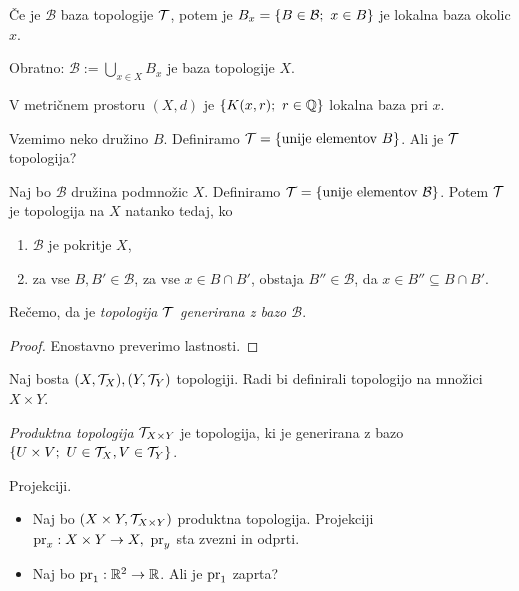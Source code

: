 \begin{trditev}
    Če je $\mathcal{B}$ baza topologije $\mathcal{T}$, potem je $B_x = \left\{B \in \mathcal{B}; \ x \in B\right\}$ je lokalna baza okolic $x$.

    Obratno: $\mathcal{B} := \bigcup_{x \in X} B_x$ je baza topologije $X$.
\end{trditev}

\begin{primer}
    V metričnem prostoru $(X, d)$ je $\left\{K(x,r); \ r \in \mathbb{Q}\right\}$ lokalna baza pri $x$.
\end{primer}

\newpage
Vzemimo neko družino $B$. Definiramo $\mathcal{T} = \left\{\text{unije elementov } B\right\}$. Ali je $\mathcal{T}$ topologija?

\begin{trditev}
    \label{trd:baza}
    Naj bo $\mathcal{B}$ družina podmnožic $X$. Definiramo $\mathcal{T} = \left\{\text{unije elementov } \mathcal{B}\right\}$. Potem $\mathcal{T}$ je topologija na $X$ natanko tedaj, ko
    \begin{enumerate}
        \item $\mathcal{B}$ je pokritje $X$,
        \item za vse $B, B' \in \mathcal{B}$, za vse $x \in B \cap B'$, obstaja $B'' \in \mathcal{B}$, da $x \in B'' \subseteq B \cap B'$.
    \end{enumerate} 
    Rečemo, da je \emph{topologija $\mathcal{T}$ generirana z bazo $\mathcal{B}$}.
\end{trditev}

\begin{proof}
    Enostavno preverimo lastnosti.
\end{proof}

Naj bosta $(X, \mathcal{T}_X), (Y, \mathcal{T}_Y)$ topologiji. Radi bi definirali topologijo na množici $X \times Y$.

\begin{definicija}
    \emph{Produktna topologija} $\mathcal{T}_{X \times Y}$ je topologija, ki je generirana z bazo $\left\{U \times V; \ U \in \mathcal{T}_X, V \in \mathcal{T}_Y\right\}$.
\end{definicija}

\begin{zgled} 
    Projekciji.
    \begin{itemize}
        \item Naj bo $(X \times Y, \mathcal{T}_{X \times Y})$ produktna topologija. Projekciji $\operatorname{pr}_x: X \times Y \to X, \ \operatorname{pr}_y$ sta zvezni in odprti.
        \item Naj bo $\operatorname{pr}_1: \mathbb{R}^2 \to \mathbb{R}$. Ali je $\operatorname{pr}_1$ zaprta?
    \end{itemize} 
\end{zgled}

